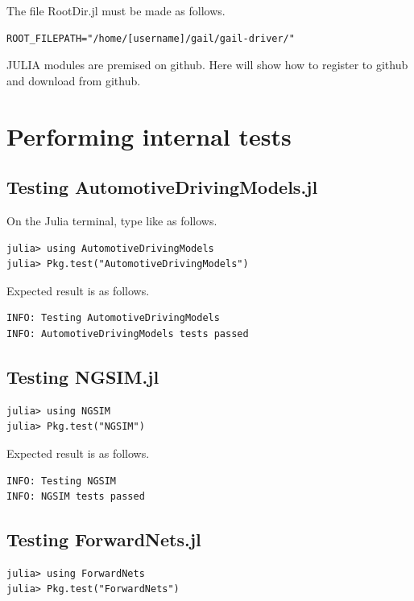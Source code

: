 \documentclass[openany,11pt]{report}%
\begin{document}
The file RootDir.jl must be made as follows.
\begin{lstlisting}[style=DOS]
ROOT_FILEPATH="/home/[username]/gail/gail-driver/"
\end{lstlisting}

JULIA modules are premised on github.
Here will show how to register to github and download from github.


\chapter{Performing internal tests}

\section{Testing AutomotiveDrivingModels.jl}

On the Julia terminal, type like as follows.

\begin{lstlisting}[style=DOS]
julia> using AutomotiveDrivingModels
julia> Pkg.test("AutomotiveDrivingModels")
\end{lstlisting}

Expected result is as follows.

\begin{lstlisting}[style=DOS]
INFO: Testing AutomotiveDrivingModels
INFO: AutomotiveDrivingModels tests passed
\end{lstlisting}

\section{Testing NGSIM.jl}

\begin{lstlisting}[style=DOS]
julia> using NGSIM
julia> Pkg.test("NGSIM")
\end{lstlisting}

Expected result is as follows.

\begin{lstlisting}[style=DOS]
INFO: Testing NGSIM
INFO: NGSIM tests passed
\end{lstlisting}

\section{Testing ForwardNets.jl}

\begin{lstlisting}[style=DOS]
julia> using ForwardNets
julia> Pkg.test("ForwardNets")
\end{lstlisting}
\end{document}
